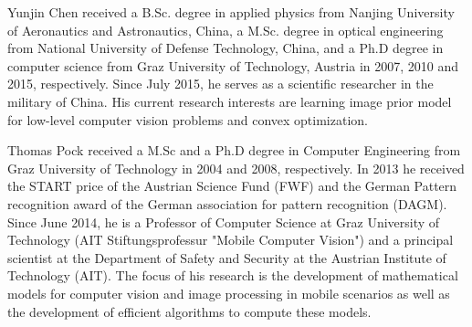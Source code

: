 \documentclass[10pt,journal,compsoc]{IEEEtran}
\begin{document}
{\footnotesize


}


\begin{IEEEbiography}{Yunjin Chen}
received a B.Sc. degree in applied physics from Nanjing University of Aeronautics 
and Astronautics, China, a M.Sc. degree in optical engineering from National 
University of Defense Technology, China, and a Ph.D degree in computer science from 
Graz University of Technology, Austria in 2007, 2010 and 2015, 
respectively. Since July 2015, he serves as 
a scientific researcher in the military of China. His current research interests are 
learning image prior model for low-level computer 
vision problems and convex optimization. 
\end{IEEEbiography}
\begin{IEEEbiography}{Thomas Pock}
received a M.Sc and a Ph.D degree in Computer Engineering 
from Graz University of Technology in 2004 and 2008, respectively. 
In 2013 he received the START price of the Austrian Science Fund (FWF) 
and the German Pattern recognition award of the German association for 
pattern recognition (DAGM). 
Since June 2014, he is a Professor of Computer Science at Graz University of 
Technology (AIT Stiftungsprofessur "Mobile Computer Vision") 
and a principal scientist at the Department of Safety and Security at the 
Austrian Institute of Technology (AIT). 
The focus of his research is the development of mathematical models for computer 
vision and image processing in mobile scenarios as well as the 
development of efficient algorithms to compute these models.
\end{IEEEbiography}
\end{document}
